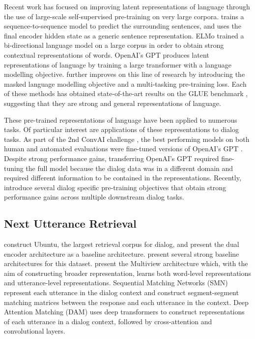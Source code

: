 \documentclass[11pt,a4paper]{article}
\begin{document}
Recent work has focused on improving latent representations of language through the use of large-scale self-supervised pre-training on very large corpora. \citet{kiros2015skip} trains a sequence-to-sequence model \citep{sutskever2014sequence} to predict the surrounding sentences, and uses the final encoder hidden state as a generic sentence representation. ELMo \citep{peters2018deep} trained a bi-directional language model on a large corpus in order to obtain strong contextual representations of words. OpenAI's GPT \citep{radford2018improving} produces latent representations of language by training a large transformer \citep{vaswani2017attention} with a language modelling objective. \citet{devlin2018bert} further improves on this line of research by introducing the masked language modelling objective and a multi-tasking pre-training loss. Each of these methods has obtained state-of-the-art results on the GLUE benchmark \citep{wang2018glue}, suggesting that they are strong and general representations of language.

These pre-trained representations of language have been applied to numerous tasks. Of particular interest are applications of these representations to dialog tasks. As part of the 2nd ConvAI challenge \citep{dinan2019second}, the best performing models on both human and automated evaluations  \citep{wolf2019transfertransfo} were fine-tuned versions of OpenAI's GPT \citep{radford2018improving}. Despite strong performance gains, transferring OpenAI's GPT required fine-tuning the full model because the dialog data was in a different domain and required different information to be contained in the representations. Recently, \citet{mehri2019pretraining} introduce several dialog specific pre-training objectives that obtain strong performance gains across multiple downstream dialog tasks.

\subsection{Next Utterance Retrieval}

 \citet{lowe2015ubuntu} construct Ubuntu, the largest retrieval corpus for dialog, and present the dual encoder architecture as a baseline architecture. \citet{kadlec2015improved} present several strong baseline architectures for this dataset. \citet{zhou2016multi} present the Multiview architecture which, with the aim of constructing broader representation, learns both word-level representations and utterance-level representations. Sequential Matching Networks (SMN) \citep{wu2016sequential} represent each utterance in the dialog context and construct segment-segment matching matrices between the response and each utterance in the context. Deep Attention Matching (DAM) \citep{zhou2018multi} uses deep transformers \citep{vaswani2017attention} to construct representations of each utterance in a dialog context, followed by cross-attention and convolutional layers. 
\end{document}
